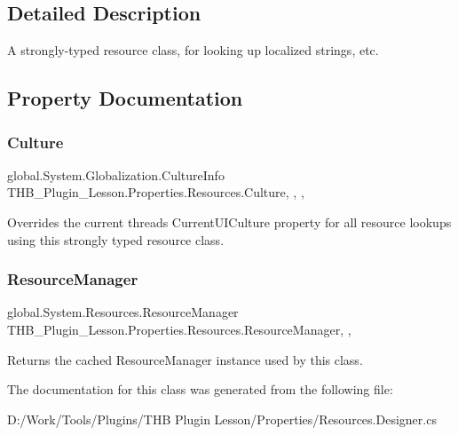 \subsection{Detailed Description}
A strongly-\/typed resource class, for looking up localized strings, etc. 



\subsection{Property Documentation}
\mbox{\label{class_t_h_b___plugin___lesson_1_1_properties_1_1_resources_a4cbee6fc062dab9463a53238fa76b2d0}} 
\subsubsection{\texorpdfstring{Culture}{Culture}}
{\footnotesize\ttfamily global.\+System.\+Globalization.\+Culture\+Info T\+H\+B\+\_\+\+Plugin\+\_\+\+Lesson.\+Properties.\+Resources.\+Culture\hspace{0.3cm}{\ttfamily [static]}, {\ttfamily [get]}, {\ttfamily [set]}, {\ttfamily [package]}}



Overrides the current thread\textquotesingle{}s Current\+U\+I\+Culture property for all resource lookups using this strongly typed resource class. 

\mbox{\label{class_t_h_b___plugin___lesson_1_1_properties_1_1_resources_ab650796d55ba8c122c31df39d29ad3fd}} 
\subsubsection{\texorpdfstring{Resource\+Manager}{ResourceManager}}
{\footnotesize\ttfamily global.\+System.\+Resources.\+Resource\+Manager T\+H\+B\+\_\+\+Plugin\+\_\+\+Lesson.\+Properties.\+Resources.\+Resource\+Manager\hspace{0.3cm}{\ttfamily [static]}, {\ttfamily [get]}, {\ttfamily [package]}}



Returns the cached Resource\+Manager instance used by this class. 



The documentation for this class was generated from the following file\+:\begin{DoxyCompactItemize}
\item 
D\+:/\+Work/\+Tools/\+Plugins/\+T\+H\+B Plugin Lesson/\+Properties/Resources.\+Designer.\+cs\end{DoxyCompactItemize}

